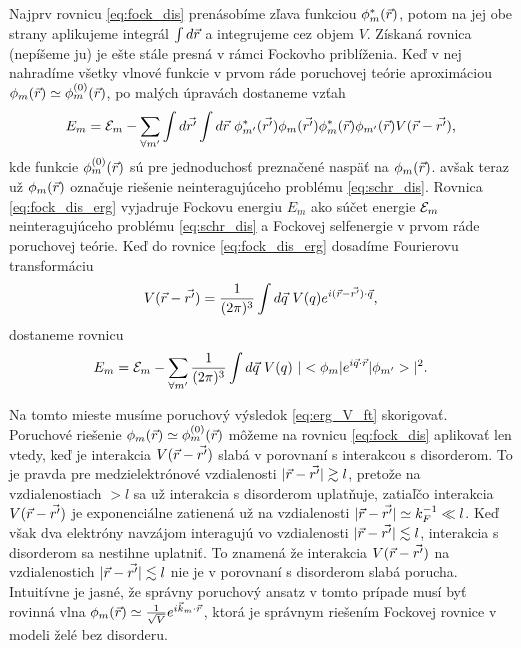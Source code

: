 Najprv rovnicu \eqref{eq:fock_dis} prenásobíme zľava funkciou $\phi^*_{m}(\vec{r})$, potom na jej obe strany aplikujeme integrál $\int d \vec{r}$ a integrujeme cez objem $V$.
Získaná rovnica (nepíšeme ju) je ešte stále presná v rámci Fockovho priblíženia. Keď v nej nahradíme všetky vlnové funkcie v prvom ráde poruchovej teórie aproximáciou
$\phi_m(\vec{r}) \simeq \phi_m^{(0)}(\vec{r})$, po malých úpravách dostaneme vzťah
\begin{equation}
 \label{eq:fock_dis_erg}
 E_m=\E_m-\sum_{\forall m'} \int d\vrp \int d\vr\ \phi^*_{m'}(\vrp) \phi_{m}(\vrp)\phi^*_{m}(\vr)\phi_{m'}(\vr)V(\vr-\vrp) \text{,}
\end{equation}
  kde funkcie
$\phi_m^{(0)}(\vec{r})$ sú pre jednoduchosť preznačené naspäť na $\phi_m(\vec{r})$.
avšak teraz už $\phi_m(\vec{r})$ označuje riešenie neinteragujúceho problému \eqref{eq:schr_dis}.
 Rovnica \eqref{eq:fock_dis_erg}
  vyjadruje Fockovu energiu $E_m$ ako súčet energie $\mathcal{E}_m$ neinteragujúceho problému \eqref{eq:schr_dis}
 a Fockovej selfenergie v prvom ráde poruchovej teórie.
Keď do rovnice \eqref{eq:fock_dis_erg} dosadíme Fourierovu transformáciu
\begin{equation}
 \label{eq:V_ft}
 V(\vr-\vrp)=\ftkvec{(\vr-\vrp)}{\vq}{V(q)}\text{,}
\end{equation}
dostaneme rovnicu
\begin{equation}
\label{eq:erg_V_ft}
 E_m=\E_m-\sum_{\forall m'}\frac{1}{(2\pi)^{3}} \int d\vq\ V(q) \ |\bra{\phi_m}e^{i\vq\cdot\vr}\ket{\phi_{m'}}|^2 \text{.}
\end{equation}

Na tomto mieste musíme poruchový výsledok \eqref{eq:erg_V_ft} skorigovať. Poruchové riešenie
$\phi_m(\vec{r}) \simeq \phi_m^{(0)}(\vec{r})$ môžeme na rovnicu  \eqref{eq:fock_dis} aplikovať len vtedy,
keď je interakcia $V(\vec{r}-\vec{r'})$ slabá v porovnaní s interakcou s disorderom.
To je pravda pre medzielektrónové vzdialenosti $|\vec{r}-\vec{r'}| \gtrsim l$, pretože na vzdialenostiach $>l$ sa už interakcia s disorderom uplatňuje,
zatiaľčo interakcia $V(\vec{r}-\vec{r'})$ je exponenciálne zatienená už na vzdialenosti $|\vec{r}-\vec{r'}| \simeq k_F^{-1} \ll l$.
Keď však dva elektróny navzájom interagujú vo vzdialenosti $|\vec{r}-\vec{r'}| \lesssim l$, interakcia s disorderom sa nestihne uplatniť.
To znamená že interakcia $V(\vec{r}-\vec{r'})$ na vzdialenostich $|\vec{r}-\vec{r'}| \lesssim l$ nie je v porovnaní s disorderom slabá porucha.
Intuitívne je jasné, že správny poruchový ansatz v tomto prípade musí byť rovinná vlna
$\phi_m(\vec{r}) \simeq \frac{1}{\sqrt V}e^{i\vec{k}_m\cdot\vec{r}}$, ktorá je správnym riešením Fockovej rovnice v modeli želé bez disorderu.

